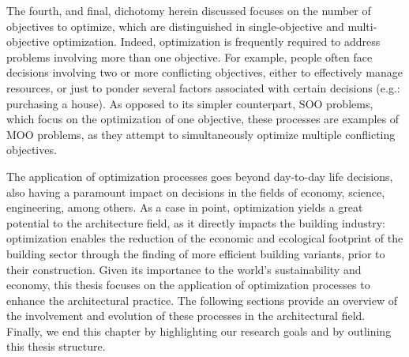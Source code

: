 	The fourth, and final, dichotomy herein discussed focuses on the number of objectives to optimize, which are distinguished in single-objective and multi-objective optimization. Indeed, optimization is frequently required to address problems involving more than one objective. For example, people often face decisions involving two or more conflicting objectives, either to effectively manage resources, or just to ponder several factors associated with certain decisions (e.g.: purchasing a house). As opposed to its simpler counterpart, \ac{SOO} problems, which focus on the optimization of one objective, these processes are examples of \ac{MOO} problems, as they attempt to simultaneously optimize multiple conflicting objectives. %
	 
	
	The application of optimization processes goes beyond day-to-day life decisions, also having a paramount impact on decisions in the fields of economy, science, engineering, among others. As a case in point, optimization yields a great potential to the architecture field, as it directly impacts the building industry: optimization enables the reduction of the economic and ecological footprint of the building sector through the finding of more efficient building variants, prior to their construction. Given its importance to the world's sustainability and economy, this thesis focuses on the application of optimization processes to enhance the architectural practice. The following sections provide an overview of the involvement and evolution of these processes in the architectural field. Finally, we end this chapter by highlighting our research goals and by outlining this thesis structure.


